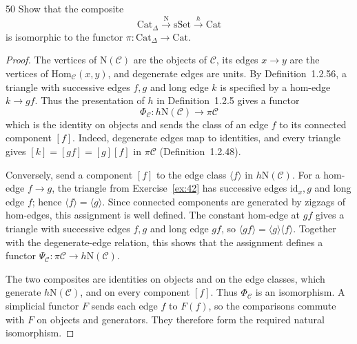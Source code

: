 \begin{exercise}{50}
Show that the composite
\[
 \mathrm{Cat}_{\Delta}\xrightarrow{\ \mathrm{N}\ }\mathrm{sSet}
 \xrightarrow{\ h\ }\mathrm{Cat}
\]
is isomorphic to the functor $\pi\colon\mathrm{Cat}_{\Delta}\to\mathrm{Cat}$.

\begin{proof}
The vertices of $\mathrm{N}(\mathcal C)$ are the objects of
$\mathcal C$, its edges $x\to y$ are the vertices of
$\mathrm{Hom}_{\mathcal C}(x,y)$, and degenerate edges are units.
By Definition~1.2.56, a triangle with successive edges $f,g$
and long edge $k$ is specified by a hom-edge $k\to gf$.
Thus the presentation of $h$ in Definition~1.2.5 gives a functor
\[
 \Phi_{\mathcal C}\colon h\mathrm{N}(\mathcal C)\longrightarrow\pi\mathcal C
\]
which is the identity on objects and sends the class of an edge $f$
to its connected component $[f]$.
Indeed, degenerate edges map to identities, and every triangle
gives $[k]=[gf]=[g][f]$ in $\pi\mathcal C$
(Definition~1.2.48).

Conversely, send a component $[f]$ to the edge class
$\langle f\rangle$ in $h\mathrm{N}(\mathcal C)$.
For a hom-edge $f\to g$, the triangle from Exercise~\ref{ex:42}
has successive edges $\mathrm{id}_x,g$ and long edge $f$;
hence $\langle f\rangle=\langle g\rangle$.
Since connected components are generated by zigzags of hom-edges,
this assignment is well defined.
The constant hom-edge at $gf$ gives a triangle with successive
edges $f,g$ and long edge $gf$, so
$\langle gf\rangle=\langle g\rangle\langle f\rangle$.
Together with the degenerate-edge relation, this shows that
the assignment defines a functor
$\Psi_{\mathcal C}\colon\pi\mathcal C\to h\mathrm{N}(\mathcal C)$.

The two composites are identities on objects and on the edge
classes, which generate $h\mathrm{N}(\mathcal C)$, and on every
component $[f]$. Thus $\Phi_{\mathcal C}$ is an isomorphism.
A simplicial functor $F$ sends each edge $f$ to $F(f)$,
so the comparisons commute with $F$ on objects and generators.
They therefore form the required natural isomorphism.
\end{proof}
\end{exercise}
